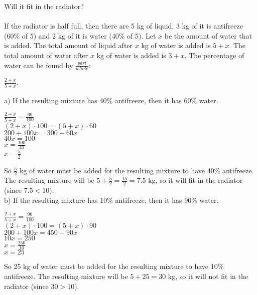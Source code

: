 \documentclass[12pt]{article}
\begin{document}
Will it fit in the radiator? \\
\\
If the radiator is half full, then there are 5 kg of liquid. 3 kg of it is antifreeze (60\% of 5) and 2 kg of it is water (40\% of 5). Let $x$ be the amount of water that is added. The total amount of liquid after $x$ kg of water is added is $5+x$. The total amount of water after $x$ kg of water is added is $3+x$. The percentage of water can be found by $\displaystyle \frac{part}{whole}$:
\begin{center}
$\displaystyle \frac{2+x}{5+x}$.
\end{center}
a) If the resulting mixture has 40\% antifreeze, then it has 60\% water.
\begin{center}
$\displaystyle \frac{2+x}{5+x}=\displaystyle \frac{60}{100}$ \\
$(2+x)\cdot100=(5+x)\cdot60$ \\
$200+100x=300+60x$ \\
$40x=100$ \\
$x=\displaystyle \frac{100}{40}$ \\
$x=\displaystyle \frac{5}{2}$
\end{center}
So $\displaystyle \frac{5}{2}$ kg of water must be added for the resulting mixture to have 40\% antifreeze. The resulting mixture will be $5+\displaystyle \frac{5}{2}=\displaystyle \frac{15}{2}=7.5$ kg, so it will fit in the radiator (since $7.5<10$). \\
b) If the resulting mixture has 10\% antifreeze, then it has 90\% water.
\begin{center}
$\displaystyle \frac{2+x}{5+x}=\displaystyle \frac{90}{100}$ \\
$(2+x)\cdot100=(5+x)\cdot90$ \\
$200+100x=450+90x$ \\
$10x=250$ \\
$x=\displaystyle \frac{250}{10}$ \\
$x=25$
\end{center}
So 25 kg of water must be added for the resulting mixture to have 10\% antifreeze. The resulting mixture will be $5+25=30$ kg, so it will not fit in the radiator (since $30>10$).
\end{document}
